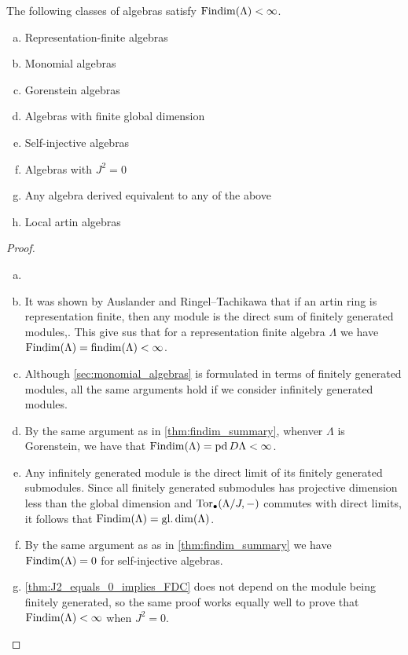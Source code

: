 \begin{theorem}\label{thm:Findim_summary}
	The following classes of algebras satisfy $\operatorname{Findim}(\Lambda) < \infty$.
	\begin{enumerate}[a)]
		\item Representation-finite algebras
		\item Monomial algebras
		\item Gorenstein algebras
		\item Algebras with finite global dimension
		\item Self-injective algebras
		\item Algebras with $J^2=0$
		\item Any algebra derived equivalent to any of the above
		\item Local artin algebras
	\end{enumerate}
	\begin{proof}
		\begin{enumerate}[(a)]
			\item[]
			\item It was shown by Auslander and Ringel--Tachikawa that if an artin ring is representation finite, then any module is the direct sum of finitely generated modules\cite[II Proposition~4.3(c)]{Aus74},\cite[Corollary~4.4]{RT74}. This give sus that for a representation finite algebra $\Lambda$ we have $\operatorname{Findim}(\Lambda) = \operatorname{findim}(\Lambda) < \infty$.
			\item Although \cref{sec:monomial_algebras} is formulated in terms of finitely generated modules, all the same arguments hold if we consider infinitely generated modules. 
			\item \label{item:Findim_gorenstein} By the same argument as in \cref{thm:findim_summary}, whenver $\Lambda$ is Gorenstein, we have that $\operatorname{Findim}(\Lambda) = \operatorname{pd} D\Lambda < \infty$.
			\item Any infinitely generated module is the direct limit of its finitely generated submodules. Since all finitely generated submodules has projective dimension less than the global dimension and $\operatorname{Tor}_\bullet(\Lambda/J, -)$ commutes with direct limits, it follows that $\operatorname{Findim}(\Lambda) = \operatorname{gl.dim}(\Lambda)$.
			\item By the same argument as as in \cref{thm:findim_summary} we have $\operatorname{Findim}(\Lambda) = 0$ for self-injective algebras.
			\item \cref{thm:J2_equals_0_implies_FDC} does not depend on the module being finitely generated, so the same proof works equally well to prove that $\operatorname{Findim}(\Lambda) < \infty$ when $J^2 = 0$.

\end{enumerate}
\end{proof}
\end{theorem}
